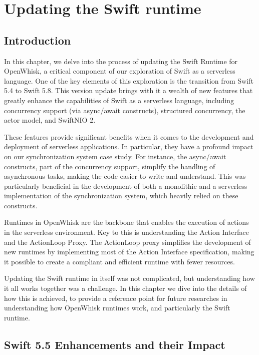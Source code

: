 \chapter{Updating the Swift runtime}
\label{ch:UpdatingRuntime}

\section{Introduction}
\label{sec:Introduction}

In this chapter, we delve into the process of updating the Swift Runtime for OpenWhisk, a critical component of our exploration of Swift as a serverless language. One of the key elements of this exploration is the transition from Swift 5.4 to Swift 5.8. This version update brings with it a wealth of new features that greatly enhance the capabilities of Swift as a serverless language, including concurrency support (via async/await constructs), structured concurrency, the actor model, and SwiftNIO 2.

These features provide significant benefits when it comes to the development and deployment of serverless applications. In particular, they have a profound impact on our synchronization system case study. For instance, the async/await constructs, part of the concurrency support, simplify the handling of asynchronous tasks, making the code easier to write and understand. This was particularly beneficial in the development of both a monolithic and a serverless implementation of the synchronization system, which heavily relied on these constructs.

Runtimes in OpenWhisk are the backbone that enables the execution of actions in the serverless environment. Key to this is understanding the Action Interface and the ActionLoop Proxy. The ActionLoop proxy simplifies the development of new runtimes by implementing most of the Action Interface specification, making it possible to create a compliant and efficient runtime with fewer resources.

Updating the Swift runtime in itself was not complicated, but understanding how it all works together was a challenge. In this chapter we dive into the details of how this is achieved, to provide a reference point for future researches in understanding how OpenWhisk runtimes work, and particularly the Swift runtime.

\section{Swift 5.5 Enhancements and their Impact}
\label{sec:SwiftEnhancements}

